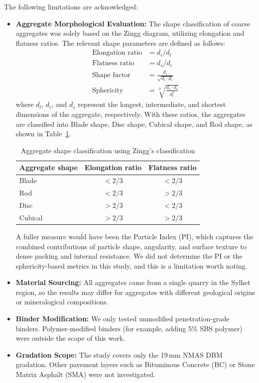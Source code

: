 \documentclass[12pt,a4paper]{article}
\begin{document}
The following limitations are acknowledged:
\begin{itemize}
    \item \textbf{Aggregate Morphological Evaluation:} The shape classification of coarse aggregates was solely based on the Zingg diagram, utilizing elongation and flatness ratios. The relevant shape parameters are defined as follows:
    \begin{align*}
        \text{Elongation ratio} &= d_i / d_l \\
        \text{Flatness ratio} &= d_s / d_i \\
        \text{Shape factor} &= \frac{d_s}{\sqrt{d_i \cdot d_l}} \\
        \text{Sphericity} &= \sqrt[3]{\frac{d_s \cdot d_i}{d_l^2}}
    \end{align*}
    where $d_l$, $d_i$, and $d_s$ represent the longest, intermediate, and shortest dimensions of the aggregate, respectively. With these ratios, the aggregates are classified into Blade shape, Disc shape, Cubical shape, and Rod shape, as shown in Table~\ref{tab:shape_classification_limitations}.
    
    \begin{table}[H]
        \centering
        \caption{Aggregate shape classification using Zingg's classification}
        \label{tab:shape_classification_limitations}
        \begin{tabular}{@{}lcc@{}}
            \toprule
            \textbf{Aggregate shape} & \textbf{Elongation ratio} & \textbf{Flatness ratio} \\
            \midrule
            Blade & $< 2/3$ & $< 2/3$ \\
            Rod & $< 2/3$ & $> 2/3$ \\
            Disc & $> 2/3$ & $< 2/3$ \\
            Cubical & $> 2/3$ & $> 2/3$ \\
            \bottomrule
        \end{tabular}
    \end{table}

    A fuller measure would have been the Particle Index (PI), which captures the combined contributions of particle shape, angularity, and surface texture to dense packing and internal resistance. We did not determine the PI or the sphericity-based metrics in this study, and this is a limitation worth noting.
    \item \textbf{Material Sourcing:} All aggregates came from a single quarry in the Sylhet region, so the results may differ for aggregates with different geological origins or mineralogical compositions.
    \item \textbf{Binder Modification:} We only tested unmodified penetration-grade binders. Polymer-modified binders (for example, adding 5\% SBS polymer) were outside the scope of this work.
    \item \textbf{Gradation Scope:} The study covers only the 19\,mm NMAS DBM gradation. Other pavement layers such as Bituminous Concrete (BC) or Stone Matrix Asphalt (SMA) were not investigated.
\end{itemize}
\end{document}
